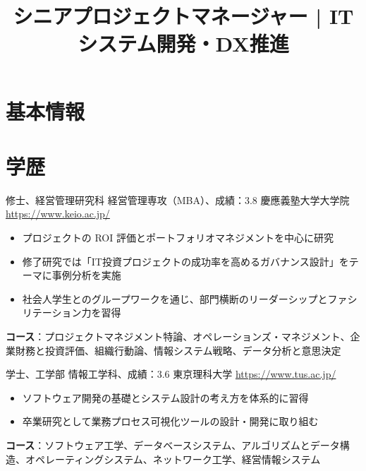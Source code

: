 \documentclass[a4paper, serif, 10pt]{moderncv}
\title{シニアプロジェクトマネージャー | ITシステム開発・DX推進}
\begin{document}
\maketitle

\section{基本情報}

\section{学歴}

        {修士、経営管理研究科 経営管理専攻（MBA）、成績：3.8}
        {慶應義塾大学大学院}
        {\url{https://www.keio.ac.jp/}}
        {}
        {\begin{itemize}
\item プロジェクトの ROI 評価とポートフォリオマネジメントを中心に研究
\item 修了研究では「IT投資プロジェクトの成功率を高めるガバナンス設計」をテーマに事例分析を実施
\item 社会人学生とのグループワークを通じ、部門横断のリーダーシップとファシリテーション力を習得
\end{itemize}
\textbf{コース}：プロジェクトマネジメント特論、オペレーションズ・マネジメント、企業財務と投資評価、組織行動論、情報システム戦略、データ分析と意思決定}

        {学士、工学部 情報工学科、成績：3.6}
        {東京理科大学}
        {\url{https://www.tus.ac.jp/}}
        {}
        {\begin{itemize}
\item ソフトウェア開発の基礎とシステム設計の考え方を体系的に習得
\item 卒業研究として業務プロセス可視化ツールの設計・開発に取り組む
\end{itemize}
\textbf{コース}：ソフトウェア工学、データベースシステム、アルゴリズムとデータ構造、オペレーティングシステム、ネットワーク工学、経営情報システム}
\end{document}
